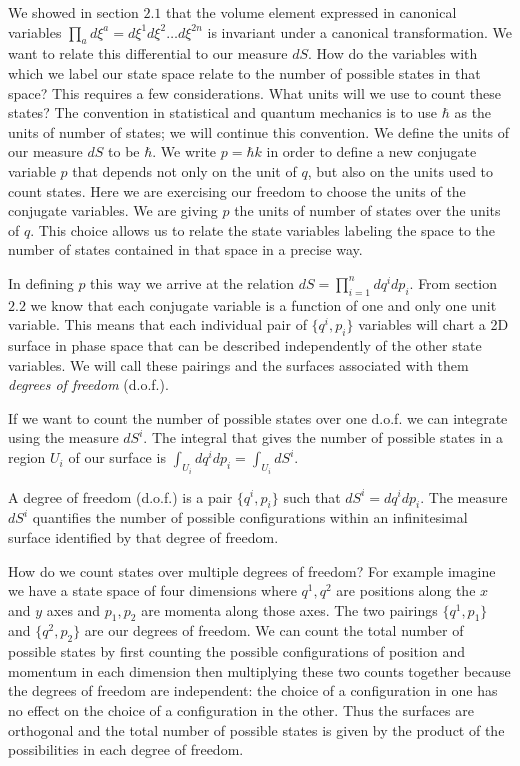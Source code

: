 \documentclass{article}[a4paper]
\begin{document}
	We showed in section $2.1$ that the volume element expressed in canonical variables $\prod_a d \xi^{a} = d\xi^1 d\xi^2 \dots d \xi^{2n}$ is invariant under a canonical transformation. We want to relate this differential to our measure $dS$. How do the variables with which we label our state space relate to the number of possible states in that space? This requires a few considerations. What units will we use to count these states? The convention in statistical and quantum mechanics is to use $\hbar$ as the units of number of states; we will continue this convention. We define the units of our measure $dS$ to be $\hbar$. We write $p = \hbar k$ in order to define a new conjugate variable $p$ that depends not only on the unit of $q$, but also on the units used to count states. Here we are exercising our freedom to choose the units of the conjugate variables. We are giving $p$ the units of number of states over the units of $q$. This choice allows us to relate the state variables labeling the space to the number of states contained in that space in a precise way. 
	
	In defining $p$ this way we arrive at the relation $dS = \prod \limits_{i = 1}^{n} dq^{i}dp_i$. From section $2.2$ we know that each conjugate variable is a function of one and only one unit variable. This means that each individual pair of $\{q^i,p_i\}$ variables will chart a 2D surface in phase space that can be described independently of the other state variables. We will call these pairings and the surfaces associated with them \textit{degrees of freedom} (d.o.f.).
	
	If we want to count the number of possible states over one d.o.f. we can integrate using the measure $dS^i$. The integral that gives the number of possible states in a region $U_i$ of our surface is $\int_{U_i} dq^i dp_i = \int_{U_i} dS^i$.

\begin{defn}
	A degree of freedom (d.o.f.) is a pair $\{q^i,p_i \}$ such that $dS^i = dq^i dp_i$. The measure $dS^i$ quantifies the number of possible configurations within an infinitesimal surface identified by that degree of freedom.
\end{defn}

	How do we count states over multiple degrees of freedom? For example imagine we have a state space of four dimensions where $q^1,q^2$ are positions along the $x$ and $y$ axes and $p_1,p_2$ are momenta along those axes. The two pairings $\{q^1,p_1 \}$ and $\{q^2,p_2 \}$ are our degrees of freedom. We can count the total number of possible states by first counting the possible configurations of position and momentum in each dimension then multiplying these two counts together because the degrees of freedom are independent: the choice of a configuration in one has no effect on the choice of a configuration in the other. Thus the surfaces are orthogonal and the total number of possible states is given by the product of the possibilities in each degree of freedom.
\end{document}
